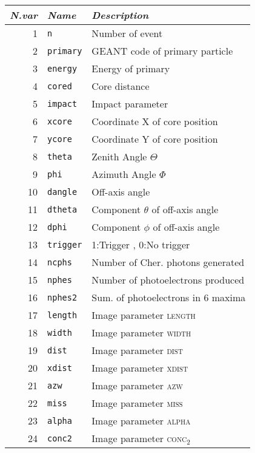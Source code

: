 \begin{table}[htbp]
  \centering
  \scriptsize
  \begin{tabular}{|rll|}
    \hline
    \emph{N.var} & \emph{Name} & \emph{Description}\hspace{12em} \\
    \hline
  1 & \texttt{n      } & Number of event \\
  2 & \texttt{primary} & GEANT code of primary particle  \\
  3 & \texttt{energy } & Energy of primary  \\
  4 & \texttt{cored  } & Core distance  \\
  5 & \texttt{impact } & Impact parameter  \\
  6 & \texttt{xcore  } & Coordinate X of core position  \\
  7 & \texttt{ycore  } & Coordinate Y of core position  \\
  8 & \texttt{theta  } & Zenith Angle $\Theta$  \\
  9 & \texttt{phi    } & Azimuth Angle $\Phi$  \\
 10 & \texttt{dangle } & Off-axis angle  \\
 11 & \texttt{dtheta } & Component $\theta$ of off-axis angle  \\
 12 & \texttt{dphi   } & Component $\phi$ of off-axis angle  \\
 13 & \texttt{trigger} & 1:Trigger , 0:No trigger  \\
 14 & \texttt{ncphs  } & Number of Cher. photons generated  \\
 15 & \texttt{nphes  } & Number of photoelectrons produced  \\
 16 & \texttt{nphes2 } & Sum. of photoelectrons in 6 maxima  \\
 17 & \texttt{length } & Image parameter \textsc{length}  \\
 18 & \texttt{width  } & Image parameter \textsc{width}  \\
 19 & \texttt{dist   } & Image parameter \textsc{dist}  \\
 20 & \texttt{xdist  } & Image parameter \textsc{xdist}  \\
 21 & \texttt{azw    } & Image parameter \textsc{azw}  \\
 22 & \texttt{miss   } & Image parameter \textsc{miss}  \\
 23 & \texttt{alpha  } & Image parameter \textsc{alpha}  \\
 24 & \texttt{conc2  } & Image parameter \textsc{conc}$_2$  \\

\end{tabular}
\end{table}
